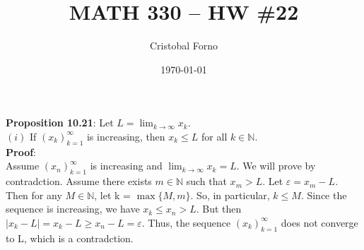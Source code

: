 \documentclass[12pt]{article}
\title{MATH 330 -- HW \#22}
\author{Cristobal Forno}
\date{\today}
\begin{document}
\maketitle

\textbf{Proposition 10.21}: Let $L = \lim_{k\to\infty} x_k.$\\
$(i)$ If $(x_k)_{k=1}^\infty$ is increasing, then $x_k \leq L$ for all $k \in \mathbb{N}$.\\
\noindent
\textbf{Proof}:\\
\indent
Assume $(x_n)_{k=1}^\infty$ is increasing and $\lim_{k\to\infty} x_k = L$. We
will prove by contradction. Assume there exists $m \in \mathbb{N}$ such that $x_m
> L$. Let $\varepsilon = x_m - L$. Then for any $M \in \mathbb{N}$, let k =
$\max\{M, m\}$. So, in particular, $k \leq M$. Since the sequence is increasing,
we have $x_k \leq x_n > L$. But then $|x_k - L| = x_k - L \geq x_n - L =
\varepsilon$. Thus, the sequence $(x_k)_{k=1}^\infty$ does not converge to L,
which is a contradction.
\end{document}
